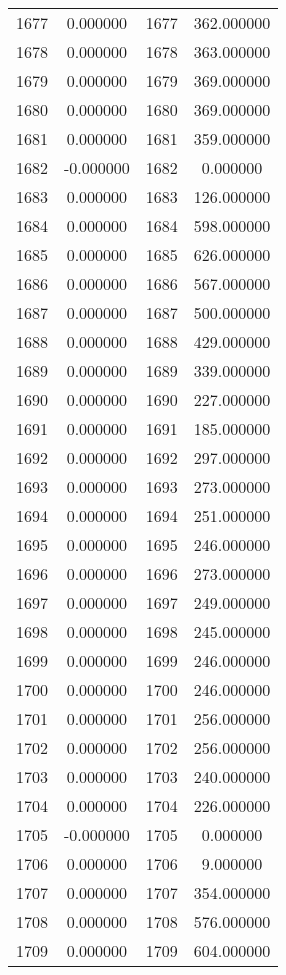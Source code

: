 \documentclass[12pt]{article}
\begin{document}
\begin{longtable}{@{}cccc@{}}
1677 & 0.000000 & 1677 & 362.000000 \\
1678 & 0.000000 & 1678 & 363.000000 \\
1679 & 0.000000 & 1679 & 369.000000 \\
1680 & 0.000000 & 1680 & 369.000000 \\
1681 & 0.000000 & 1681 & 359.000000 \\
1682 & -0.000000 & 1682 & 0.000000 \\
1683 & 0.000000 & 1683 & 126.000000 \\
1684 & 0.000000 & 1684 & 598.000000 \\
1685 & 0.000000 & 1685 & 626.000000 \\
1686 & 0.000000 & 1686 & 567.000000 \\
1687 & 0.000000 & 1687 & 500.000000 \\
1688 & 0.000000 & 1688 & 429.000000 \\
1689 & 0.000000 & 1689 & 339.000000 \\
1690 & 0.000000 & 1690 & 227.000000 \\
1691 & 0.000000 & 1691 & 185.000000 \\
1692 & 0.000000 & 1692 & 297.000000 \\
1693 & 0.000000 & 1693 & 273.000000 \\
1694 & 0.000000 & 1694 & 251.000000 \\
1695 & 0.000000 & 1695 & 246.000000 \\
1696 & 0.000000 & 1696 & 273.000000 \\
1697 & 0.000000 & 1697 & 249.000000 \\
1698 & 0.000000 & 1698 & 245.000000 \\
1699 & 0.000000 & 1699 & 246.000000 \\
1700 & 0.000000 & 1700 & 246.000000 \\
1701 & 0.000000 & 1701 & 256.000000 \\
1702 & 0.000000 & 1702 & 256.000000 \\
1703 & 0.000000 & 1703 & 240.000000 \\
1704 & 0.000000 & 1704 & 226.000000 \\
1705 & -0.000000 & 1705 & 0.000000 \\
1706 & 0.000000 & 1706 & 9.000000 \\
1707 & 0.000000 & 1707 & 354.000000 \\
1708 & 0.000000 & 1708 & 576.000000 \\
1709 & 0.000000 & 1709 & 604.000000 \\

\end{longtable}
\end{document}
